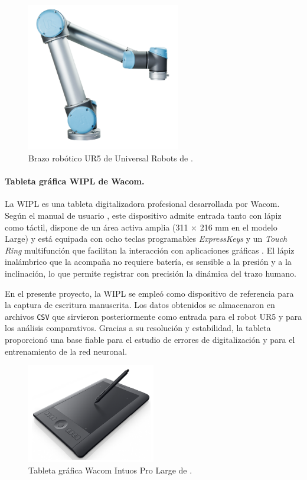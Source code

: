 \documentclass[12pt,a4paper,oneside]{report}
\begin{document}
\begin{figure}[H]
\centering
\includegraphics[width=0.6\textwidth]{figuras/UR5.png}
\caption{Brazo robótico UR5 de Universal Robots de \cite{ur5manual}.}
\label{fig:UR5}
\end{figure}

\paragraph{Tableta gráfica \acrfull{WIPL} de Wacom.}La \acrfull{WIPL} es una tableta digitalizadora profesional desarrollada por Wacom.  
Según el manual de usuario \cite{wacom_manual}, este dispositivo admite entrada tanto con lápiz como táctil, 
dispone de un área activa amplia (311 $\times$ 216 mm en el modelo Large) y está equipada con ocho 
teclas programables \textit{ExpressKeys} y un \textit{Touch Ring} multifunción que facilitan la interacción 
con aplicaciones gráficas \cite{wacom_manual}. El lápiz inalámbrico que la acompaña no requiere batería, 
es sensible a la presión y a la inclinación, lo que permite registrar con precisión la dinámica del trazo 
humano.

En el presente proyecto, la \acrshort{WIPL} se empleó como dispositivo de referencia para la captura 
de escritura manuscrita. Los datos obtenidos se almacenaron en archivos \texttt{CSV} que sirvieron 
posteriormente como entrada para el robot \acrshort{UR5} y para los análisis comparativos. Gracias a 
su resolución y estabilidad, la tableta proporcionó una base fiable para el estudio de errores de 
digitalización y para el entrenamiento de la red neuronal. 

\begin{figure}[H]
\centering
\includegraphics[width=0.5\textwidth]{figuras/WIPL.png}
\caption{Tableta gráfica Wacom Intuos Pro Large de \cite{wacom_manual}.}
\label{fig:Wacom}
\end{figure}
\end{document}
